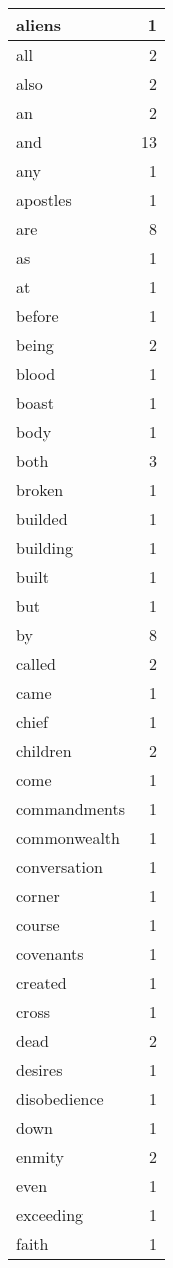 \begin{center}
\begin{longtable}{l|r}
aliens & 1\\ \hline 
all & 2\\ \hline 
also & 2\\ \hline 
an & 2\\ \hline 
and & 13\\ \hline 
any & 1\\ \hline 
apostles & 1\\ \hline 
are & 8\\ \hline 
as & 1\\ \hline 
at & 1\\ \hline 
before & 1\\ \hline 
being & 2\\ \hline 
blood & 1\\ \hline 
boast & 1\\ \hline 
body & 1\\ \hline 
both & 3\\ \hline 
broken & 1\\ \hline 
builded & 1\\ \hline 
building & 1\\ \hline 
built & 1\\ \hline 
but & 1\\ \hline 
by & 8\\ \hline 
called & 2\\ \hline 
came & 1\\ \hline 
chief & 1\\ \hline 
children & 2\\ \hline 
come & 1\\ \hline 
commandments & 1\\ \hline 
commonwealth & 1\\ \hline 
conversation & 1\\ \hline 
corner & 1\\ \hline 
course & 1\\ \hline 
covenants & 1\\ \hline 
created & 1\\ \hline 
cross & 1\\ \hline 
dead & 2\\ \hline 
desires & 1\\ \hline 
disobedience & 1\\ \hline 
down & 1\\ \hline 
enmity & 2\\ \hline 
even & 1\\ \hline 
exceeding & 1\\ \hline 
faith & 1\\ \hline 

\end{longtable}
\end{center}
